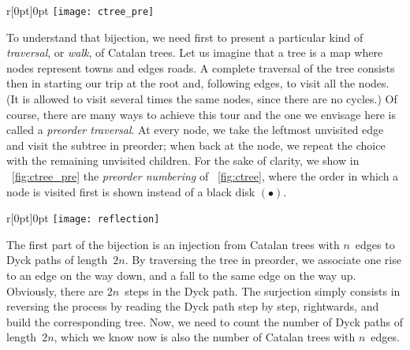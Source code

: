 \begin{wrapfigure}[7]{r}[0pt]{0pt}
\centering
\texttt{[image: ctree\_pre]}
\caption{\label{fig:ctree_pre}}
\end{wrapfigure}
To understand that bijection, we need first to present a particular
kind of \emph{traversal}, or
\emph{walk}, of Catalan trees. Let us
imagine that a tree is a map where nodes represent towns and edges
roads. A complete traversal of the tree consists then in starting our
trip at the root and, following edges, to visit all the nodes. (It is
allowed to visit several times the same nodes, since there are no
cycles.) Of course, there are many ways to achieve this tour and the
one we envisage here is called a \emph{preorder traversal}. At every
node, we take the leftmost unvisited edge and visit the subtree in
preorder; when back at the node, we repeat the choice with the
remaining unvisited children. For the sake of clarity, we show in
\fig~\ref{fig:ctree_pre} the \emph{preorder numbering} of \fig~\ref{fig:ctree}, where the order in
which a node is visited first is shown instead of a black disk
\((\bullet)\).

\begin{wrapfigure}[12]{r}[0pt]{0pt}
\centering
\texttt{[image: reflection]}
\caption{Reflection of a prefix w.r.t. \(y = x - 1\)
\label{fig:reflection}}
\end{wrapfigure}
The first part of the bijection is an injection from Catalan trees
with \(n\)~edges to Dyck paths of length~\(2n\). By traversing the
tree in preorder, we associate one rise to an edge on the way down,
and a fall to the same edge on the way up. Obviously, there are
\(2n\)~steps in the Dyck path. The surjection simply consists in
reversing the process by reading the Dyck path step by step,
rightwards, and build the corresponding tree. Now, we need to count
the number of Dyck paths of length~\(2n\), which we know now is also
the number of Catalan trees with \(n\)~edges.

